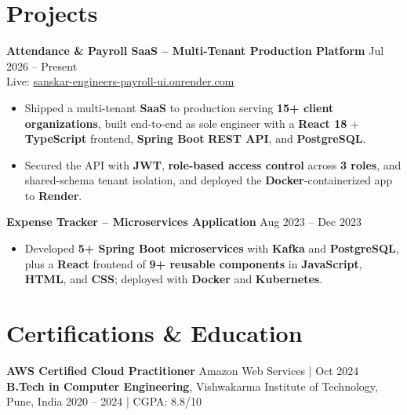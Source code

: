 \documentclass[a4paper,10pt]{article}
\begin{document}
\section*{Projects}

\textbf{Attendance \& Payroll SaaS -- Multi-Tenant Production Platform} \hfill Jul 2026 -- Present \\
Live: \href{https://sanskar-engineers-payroll-ui.onrender.com/login}{sanskar-engineers-payroll-ui.onrender.com}
\begin{itemize}[leftmargin=*]
    \item Shipped a multi-tenant \textbf{SaaS} to production serving \textbf{15+ client organizations}, built end-to-end as sole engineer with a \textbf{React 18} + \textbf{TypeScript} frontend, \textbf{Spring Boot} \textbf{REST API}, and \textbf{PostgreSQL}.
    \item Secured the API with \textbf{JWT}, \textbf{role-based access control} across \textbf{3 roles}, and shared-schema tenant isolation, and deployed the \textbf{Docker}-containerized app to \textbf{Render}.
\end{itemize}

\textbf{Expense Tracker -- Microservices Application} \hfill Aug 2023 -- Dec 2023
\begin{itemize}[leftmargin=*]
    \item Developed \textbf{5+ Spring Boot microservices} with \textbf{Kafka} and \textbf{PostgreSQL}, plus a \textbf{React} frontend of \textbf{9+ reusable components} in \textbf{JavaScript}, \textbf{HTML}, and \textbf{CSS}; deployed with \textbf{Docker} and \textbf{Kubernetes}.
\end{itemize}

\section*{Certifications \& Education}
\textbf{AWS Certified Cloud Practitioner} \hfill Amazon Web Services \;|\; Oct 2024 \\
\textbf{B.Tech in Computer Engineering}, Vishwakarma Institute of Technology, Pune, India \hfill 2020 -- 2024 \;|\; CGPA: 8.8/10
\end{document}
